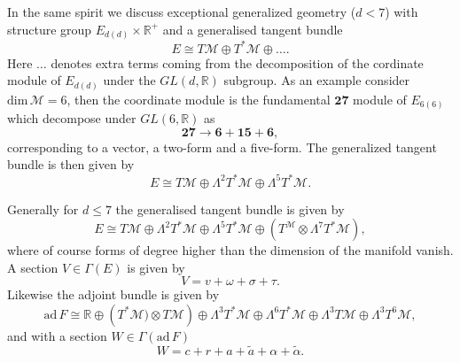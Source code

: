 In the same spirit we discuss exceptional generalized geometry ($d<7$) with structure group $E_{d(d)}\times \mathbb{R}^+$ and a generalised tangent bundle 
\begin{equation}
    E\cong T\mathcal{M}\oplus T^*\mathcal{M}\oplus\ldots.
\end{equation}
Here $\ldots$ denotes extra terms coming from the decomposition of the cordinate module of $E_{d(d)}$ under the $GL(d,\mathbb{R})$ subgroup. As an example consider $\text{dim}\,\mathcal{M}=6$, then the coordinate module is the fundamental $\mathbf{27}$ module of $E_{6(6)}$ which decompose under $GL(6,\mathbb{R})$ as 
\begin{equation}
    \mathbf{27}\to \mathbf{6}+\mathbf{15}+\mathbf{6},
\end{equation}
corresponding to a vector, a two-form and a five-form. The generalized tangent bundle is then given by 
\begin{equation}
    E \cong T\mathcal{M}\oplus\Lambda^2T^*\mathcal{M}\oplus\Lambda^5T^*\mathcal{M}.
\end{equation}

Generally for $d\leq 7$ the generalised tangent bundle is given by 
\begin{equation}
    E \cong T\mathcal{M}\oplus\Lambda^2T^*\mathcal{M}\oplus\Lambda^5T^*\mathcal{M}\oplus\left(T^\mathcal{M}\otimes \Lambda^7T^*\mathcal{M}\right),
\end{equation}
where of course forms of degree higher than the dimension of the manifold vanish. A section $V\in\Gamma(E)$ is given by 
\begin{equation}
    V = v+\omega+\sigma+\tau.
\end{equation}
Likewise the adjoint bundle is given by 
\begin{equation}
    \text{ad}\, F \cong \mathbb{R}\oplus \left(T^*\mathcal{M})\otimes T\mathcal{M}\right)\oplus \Lambda^3 T^*\mathcal{M}\oplus\Lambda^6 T^*\mathcal{M}\oplus\Lambda^3 T\mathcal{M}\oplus\Lambda^3 T^6\mathcal{M},
\end{equation}
and with a section $W\in\Gamma(\text{ad}\,F)$
\begin{equation}
    W = c+r+a+\tilde{a}+\alpha+\tilde{\alpha}.
\end{equation}


